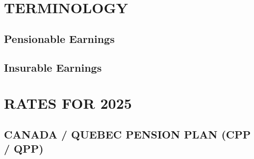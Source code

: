 \documentclass[letterpaper,10pt,english]{sphinxmanual}
\begin{document}
\sphinxstepscope


\chapter{TERMINOLOGY}
\label{\detokenize{terminology:terminology}}\label{\detokenize{terminology::doc}}

\section{Pensionable Earnings}
\label{\detokenize{terminology:pensionable-earnings}}

\section{Insurable Earnings}
\label{\detokenize{terminology:insurable-earnings}}
\sphinxstepscope


\chapter{RATES FOR 2025}
\label{\detokenize{rates_2025:rates-for-2025}}\label{\detokenize{rates_2025::doc}}

\section{CANADA / QUEBEC PENSION PLAN (CPP / QPP)}
\label{\detokenize{rates_2025:canada-quebec-pension-plan-cpp-qpp}}
\end{document}
